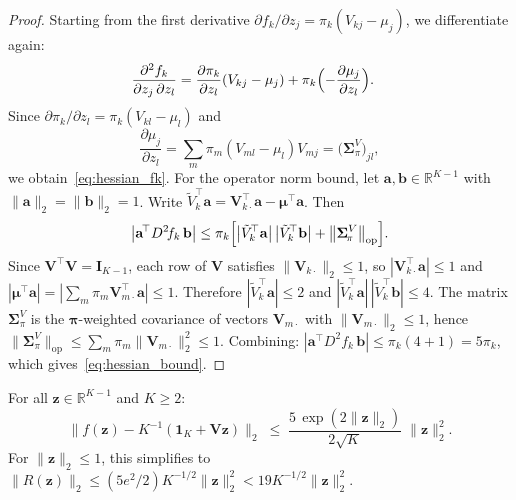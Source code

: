 \begin{proof}
Starting from the first derivative
$\partial f_k/\partial z_j = \pi_k(V_{kj}-\mu_j)$,
we differentiate again:
\begin{align*}
  \frac{\partial^2 f_k}{\partial z_j\,\partial z_l}
  &= \frac{\partial\pi_k}{\partial z_l}(V_{kj}-\mu_j)
     + \pi_k\Bigl(-\frac{\partial\mu_j}{\partial z_l}\Bigr).
\end{align*}
Since $\partial\pi_k/\partial z_l = \pi_k(V_{kl}-\mu_l)$ and
\[
  \frac{\partial\mu_j}{\partial z_l}
  = \sum_m \pi_m(V_{ml}-\mu_l)V_{mj}
  = \bigl(\boldsymbol{\Sigma}_{\!\pi}^V\bigr)_{\!jl},
\]
we obtain~\eqref{eq:hessian_fk}. For the operator norm bound, let
$\mathbf{a},\mathbf{b}\in\mathbb{R}^{K-1}$ with $\|\mathbf{a}\|_2
=\|\mathbf{b}\|_2=1$. Write
$\tilde{V}_{k}^{\!\top}\mathbf{a}
= \mathbf{V}_{k\cdot}^{\!\top}\mathbf{a}
  - \boldsymbol{\mu}^{\!\top}\mathbf{a}$.
Then
\[
  \bigl|\mathbf{a}^{\!\top}D^2\!f_k\,\mathbf{b}\bigr|
  \leq \pi_k\Bigl[
    \bigl|\tilde{V}_{k}^{\!\top}\mathbf{a}\bigr|\,
    \bigl|\tilde{V}_{k}^{\!\top}\mathbf{b}\bigr|
    + \bigl\|\boldsymbol{\Sigma}_{\!\pi}^V\bigr\|_{\mathrm{op}}
  \Bigr].
\]
Since $\mathbf{V}^{\!\top}\mathbf{V}=\mathbf{I}_{K-1}$, each row of
$\mathbf{V}$ satisfies $\|\mathbf{V}_{k\cdot}\|_2\leq 1$, so
$|\mathbf{V}_{k\cdot}^{\!\top}\mathbf{a}|\leq 1$ and
$|\boldsymbol{\mu}^{\!\top}\mathbf{a}|
= |\sum_m \pi_m \mathbf{V}_{m\cdot}^{\!\top}\mathbf{a}| \leq 1$.
Therefore $|\tilde{V}_k^{\!\top}\mathbf{a}|\leq 2$ and
$|\tilde{V}_k^{\!\top}\mathbf{a}|\,|\tilde{V}_k^{\!\top}\mathbf{b}|
\leq 4$.
The matrix $\boldsymbol{\Sigma}_{\!\pi}^V$ is the
$\boldsymbol{\pi}$-weighted covariance of vectors
$\mathbf{V}_{m\cdot}$ with $\|\mathbf{V}_{m\cdot}\|_2\leq 1$,
hence $\|\boldsymbol{\Sigma}_{\!\pi}^V\|_{\mathrm{op}}
\leq \sum_m\pi_m\|\mathbf{V}_{m\cdot}\|_2^2 \leq 1$.
Combining: $|\mathbf{a}^{\!\top}D^2\!f_k\,\mathbf{b}| \leq
\pi_k(4+1) = 5\pi_k$,
which gives~\eqref{eq:hessian_bound}.
\end{proof}

\begin{proposition}
\label{prop:remainder}
For all $\mathbf{z}\in\mathbb{R}^{K-1}$ and $K\geq 2$:
\begin{equation}
  \bigl\|
    f(\mathbf{z}) - K^{-1}(\mathbf{1}_K + \mathbf{V}\mathbf{z})
  \bigr\|_2
  \;\leq\;
  \frac{5\,\exp(2\|\mathbf{z}\|_2)}{2\sqrt{K}}
  \;\|\mathbf{z}\|_2^2.
  \label{eq:remainder_bound}
\end{equation}
For $\|\mathbf{z}\|_2\leq 1$, this simplifies to
$\|R(\mathbf{z})\|_2 \leq (5e^2/2) K^{-1/2}\|\mathbf{z}\|_2^2
 < 19 K^{-1/2}\|\mathbf{z}\|_2^2$.
\end{proposition}

